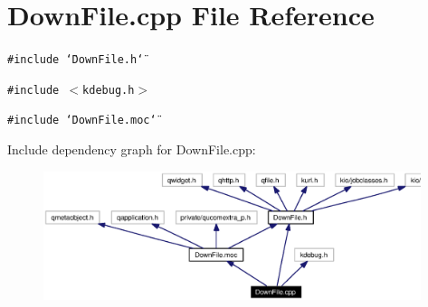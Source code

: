 \section{Down\-File.cpp File Reference}
\label{DownFile_8cpp}


{\tt \#include \char`\"{}Down\-File.h\char`\"{}}\par
{\tt \#include $<$kdebug.h$>$}\par
{\tt \#include \char`\"{}Down\-File.moc\char`\"{}}\par


Include dependency graph for Down\-File.cpp:\begin{figure}[H]
\begin{center}
\leavevmode
\includegraphics[width=313pt]{DownFile_8cpp__incl}
\end{center}
\end{figure}
